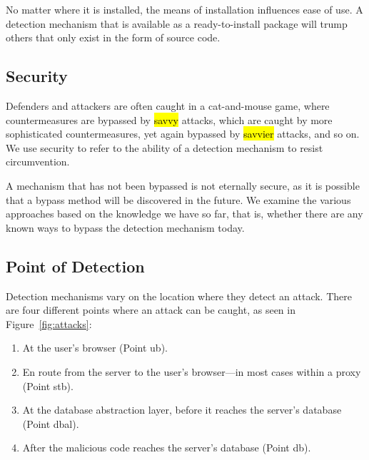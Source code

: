 \documentclass[10pt,journal,compsoc]{IEEEtran}
\newcommand{\hlc}[2][yellow]{ {\sethlcolor{#1} \hl{#2}} }
\begin{document}
No matter where it is installed, the means of installation influences
ease of use. A detection mechanism that is available as a ready-to-install
package will trump others that only exist in the form
of source code. 

\vspace{-0.5mm}
\subsection{Security}
\vspace{-0.5mm}

Defenders and attackers are often caught in a cat-and-mouse game,
where countermeasures are bypassed by \hlc[yellow]{savvy} attacks, which are caught
by more sophisticated countermeasures, yet again bypassed by \hlc[yellow]{savvier}
attacks, and so on. We use security to refer to the ability of a
detection mechanism to resist circumvention. 

A mechanism that has not been bypassed is not eternally secure, as it
is possible that a bypass method will be discovered in the future. We
examine the various approaches based on the knowledge we have so far,
that is, whether there are any known ways to bypass the detection
mechanism today.

\subsection{Point of Detection}
\label{sec:point}
\vspace{-0.5mm}

Detection mechanisms vary on the location where they detect an attack.
There are four different points where an attack can be caught, as seen
in Figure~\ref{fig:attacks}:
\vspace{-1mm}
\begin{enumerate}
\item At the user's browser (Point {\sc ub}).
\item En route from the server to the user's browser---in most cases
within a proxy (Point {\sc s}t{\sc b}).
\item At the database abstraction layer, before it reaches the server's database
  (Point {\sc dbal}).
\item After the malicious code reaches the server's database
  (Point {\sc db}).
\end{enumerate}
\vspace{-0.8mm}
\end{document}
